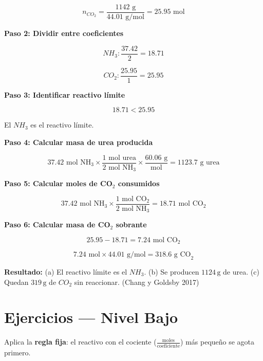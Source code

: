 \documentclass[
  spanish,
  letterpaper,
  12pt,
  oneside,
  open=any]{scrbook}
\newcommand{\setcolorsection}[2]{%
  \definecolor{currentsectionbg}{HTML}{#1}%
  \definecolor{currentsectionborder}{HTML}{#2}%
}
\begin{document}
\[n_{CO_2} = \frac{1142 \text{ g}}{44.01 \text{ g/mol}} = 25.95 \text{ mol}\]

\textbf{Paso 2: Dividir entre coeficientes}

\[NH_3: \frac{37.42}{2} = 18.71\]

\[CO_2: \frac{25.95}{1} = 25.95\]

\textbf{Paso 3: Identificar reactivo límite}

\[18.71 < 25.95\]

El \textbf{\(NH_3\)} es el reactivo límite.

\textbf{Paso 4: Calcular masa de urea producida}

\[37.42 \text{ mol NH}_3 \times \frac{1 \text{ mol urea}}{2 \text{ mol NH}_3} \times \frac{60.06 \text{ g}}{\text{mol}} = 1123.7 \text{ g urea}\]

\textbf{Paso 5: Calcular moles de CO\(_2\) consumidos}

\[37.42 \text{ mol NH}_3 \times \frac{1 \text{ mol CO}_2}{2 \text{ mol NH}_3} = 18.71 \text{ mol CO}_2\]

\textbf{Paso 6: Calcular masa de CO\(_2\) sobrante}

\[25.95 - 18.71 = 7.24 \text{ mol CO}_2\]

\[7.24 \text{ mol} \times 44.01 \text{ g/mol} = 318.6 \text{ g CO}_2\]

\textbf{Resultado:} (a) El reactivo límite es el \(NH_3\). (b) Se
producen \(1124\,\text{g}\) de urea. (c) Quedan \(319\,\text{g}\) de
\(CO_2\) sin reaccionar. (Chang y Goldsby 2017)

\setcolorsection{b2e0d8}{98ccc4}

\section{Ejercicios --- Nivel Bajo}\label{ejercicios-nivel-bajo}

Aplica la \textbf{regla fija}: el reactivo con el cociente
(\(\frac{\text{moles}}{\text{coeficiente}}\)) más pequeño se agota
primero.
\end{document}
